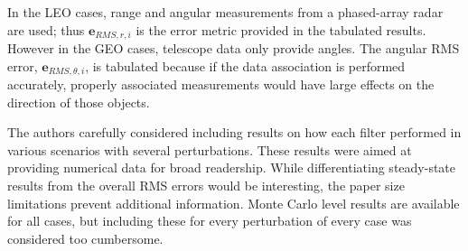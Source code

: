 \documentclass[11pt]{article}
\newenvironment{correction}{\begin{list}{}{\setlength{\leftmargin}{1cm}\setlength{\rightmargin}{1cm}}\vspace{\parsep}\item[]``}{''\end{list}}
\begin{document}
\begin{itemize}
\begin{enumerate}
In the LEO cases, range and angular measurements from a phased-array radar are used; thus $\mathbf{e}_{RMS,r,i}$ is the error metric provided in the tabulated results.
However in the GEO cases, telescope data only provide angles. The angular RMS error, $\mathbf{e}_{RMS,\theta,i}$, is tabulated because if the data association is performed accurately, properly associated measurements would have large effects on the direction of those objects.

The authors carefully considered including results on how each filter performed in various scenarios with several perturbations. These results were aimed at providing numerical data for broad readership. While differentiating steady-state results from the overall RMS errors would be interesting, the paper size limitations prevent additional information. Monte Carlo level results are available for all cases, but including these for every perturbation of every case was considered too cumbersome. 

\end{enumerate}

\end{itemize}
%
%
%
%
%
\end{document}
